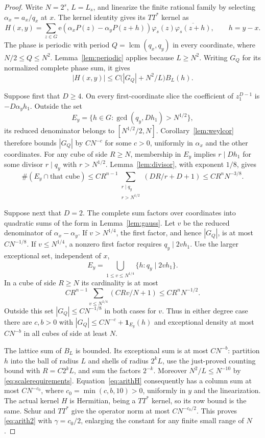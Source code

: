 \documentclass[11pt,oneside]{article}
\theoremstyle{definition}\newtheorem{definition}[theorem]{Definition}
\theoremstyle{remark}\newtheorem{remark}[theorem]{Remark}
\newcommand{\ee}[1]{\mathrm e\!\left(#1\right)}
\newcommand{\ind}{\mathbf 1}\newcommand{\supp}{\operatorname{supp}}\newcommand{\dist}{\operatorname{dist}}
\newcommand{\lcm}{\operatorname{lcm}}\newcommand{\vol}{\operatorname{vol}}
\begin{document}
\begin{proof}
Write $N=2^s$, $L=L_s$, and linearize the finite rational family by selecting
$\alpha_x=a_x/q_x$ at $x$. The kernel identity gives its $TT^*$ kernel as
\[
 H(x,y)=\sum_{z\in G}\ee{\alpha_xP(z)-\alpha_yP(z+h)}
                         \varphi_s(z)\overline{\varphi_s(z+h)},
 \qquad h=y-x.
\]
The phase is periodic with period $Q=\lcm(q_x,q_y)$ in every coordinate,
where $N/2\leq Q\leq N^2$. Lemma~\ref{lem:periodic} applies because $L\geq N^2$.
Writing $G_Q$ for its normalized complete phase sum, it gives
\begin{equation}\label{eq:arithH}
 |H(x,y)|\leq C\bigl(|G_Q|+N^2/L\bigr)B_L(h).
\end{equation}

Suppose first that $D\geq4$. On every first-coordinate slice the coefficient
of $z_1^{D-1}$ is $-D\alpha_yh_1$. Outside the set
\[
 E_y=\{h\in G:\gcd(q_y,Dh_1)>N^{1/2}\},
\]
its reduced denominator belongs to $[N^{1/2}/2,N]$.
Corollary~\ref{lem:weylcor} therefore bounds $|G_Q|$ by $CN^{-c}$ for some
$c>0$, uniformly in $\alpha_x$ and the other coordinates.
For any cube of side $R\geq N$, membership in $E_y$ implies
$r\mid Dh_1$ for some divisor $r\mid q_y$ with $r>N^{1/2}$.
Lemma~\ref{lem:divisor}, with exponent $1/8$, gives
\[
 \#(E_y\cap\text{that cube})
 \leq CR^{n-1}\sum_{\substack{r\mid q_y\\r>N^{1/2}}}(DR/r+D+1)
 \leq CR^nN^{-3/8}.
\]

Suppose next that $D=2$. The complete sum factors over coordinates into
quadratic sums of the form in Lemma~\ref{lem:gauss}. Let $v$ be the reduced
denominator of $\alpha_x-\alpha_y$. If $v>N^{1/4}$, the first factor, and
hence $|G_Q|$, is at most $CN^{-1/8}$. If $v\leq N^{1/4}$, a nonzero first
factor requires $q_y\mid2v h_1$. Use the larger exceptional set, independent
of $x$,
\[
 E_y=\bigcup_{1\leq v\leq N^{1/4}}\{h:q_y\mid2v h_1\}.
\]
In a cube of side $R\geq N$ its cardinality is at most
\[
 CR^{n-1}\sum_{v\leq N^{1/4}}(C Rv/N+1)
          \leq CR^nN^{-1/2}.
\]
Outside this set $|G_Q|\leq CN^{-1/8}$ in both cases for $v$.
Thus in either degree case there are $c,b>0$ with
$|G_Q|\leq CN^{-c}+\ind_{E_y}(h)$ and exceptional density at most $CN^{-b}$
in all cubes of side at least $N$.

The lattice sum of $B_L$ is bounded. Its exceptional sum is at most
$CN^{-b}$: partition $h$ into the ball of radius $L$ and shells of radius
$2^kL$, use the just-proved counting bound with $R=C2^kL$, and sum the factors
$2^{-k}$. Moreover $N^2/L\leq N^{-10}$ by \eqref{eq:scalerequirements}.
Equation~\eqref{eq:arithH} consequently has a column sum at most $CN^{-c_0}$,
where $c_0=\min(c,b,10)>0$, uniformly in $y$ and the linearization.
The actual kernel $H$ is Hermitian, being a $TT^*$ kernel, so its row bound
is the same. Schur and $TT^*$ give the operator norm at most $CN^{-c_0/2}$.
This proves \eqref{eq:arith2} with $\gamma=c_0/2$, enlarging the constant for
any finite small range of $N$.


\end{proof}
\end{document}
